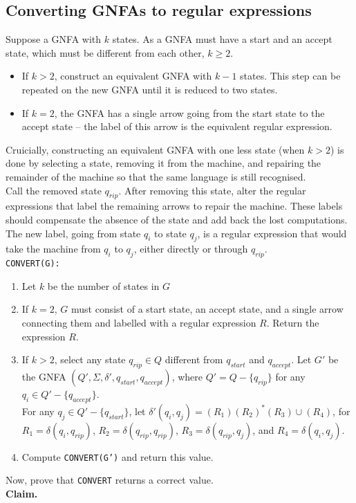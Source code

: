 \documentclass{article}
\begin{document}
\subsection{Converting GNFAs to regular expressions}
Suppose a GNFA with $k$ states. As a GNFA must have a start and an accept state, which must be different from each other, $k \geq 2$.
\begin{itemize}
	\item If $k > 2$, construct an equivalent GNFA with $k - 1$ states. This step can be repeated on the new GNFA until it is reduced to two states.
	\item If $k = 2$, the GNFA has a single arrow going from the start state to the accept state -- the label of this arrow is the equivalent regular expression.
\end{itemize}
Cruicially, constructing an equivalent GNFA with one less state (when $k > 2$) is done by selecting a state, removing it from the machine, and repairing the remainder of the machine so that the same language is still recognised.\medskip
\\ Call the removed state $q_{rip}$. After removing this state, alter the regular expressions that label the remaining arrows to repair the machine. These labels should compensate the absence of the state and add back the lost computations.\medskip
\\ The new label, going from state $q_i$ to state $q_j$, is a regular expression that would take the machine from $q_i$ to $q_j$, either directly or through $q_{rip}$.\medskip
\\\texttt{CONVERT(G):}
\begin{enumerate}
	\item Let $k$ be the number of states in $G$
	\item If $k=2$, $G$ must consist of a start state, an accept state, and a single arrow connecting them and labelled with a regular expression $R$. Return the expression $R$.
	\item If $k > 2$, select any state $q_{rip} \in Q$ different from $q_{start}$ and $q_{accept}$. Let $G'$ be the GNFA $(Q', \Sigma, \delta', q_{start}, q_{accept})$, where $Q' = Q - \{q_{rip}\}$ for any $q_i \in Q' - \{q_{accept}\}$.
	\\ For any $q_j \in Q' - \{q_{start}\}$, let $\delta'(q_i, q_j) = (R_1)(R_2)^*(R_3)\cup(R_4)$, for $R_1 = \delta(q_i, q_{rip})$, $R_2 = \delta(q_{rip}, q_{rip})$, $R_3 = \delta(q_{rip}, q_j)$, and $R_4 = \delta(q_i, q_j)$.
	\item Compute \texttt{CONVERT(G')} and return this value.
\end{enumerate}
Now, prove that \texttt{CONVERT} returns a correct value.\medskip
\\\textbf{Claim.}
\end{document}
